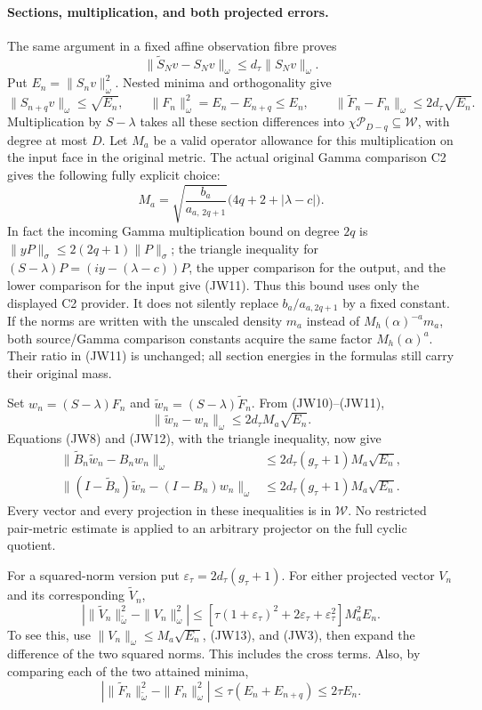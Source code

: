 \documentclass[11pt]{article}
\newcommand{\Pcal}{\mathcal P}
\begin{document}
\paragraph{Sections, multiplication, and both projected errors.}
The same argument in a fixed affine observation fibre proves
\[
\|\widetilde S_Nv-S_Nv\|_\omega
\le d_\tau\|S_Nv\|_\omega.
\tag{JW9}
\]
Put \(E_n=\|S_nv\|_\omega^2\).
Nested minima and orthogonality give
\[
\|S_{n+q}v\|_\omega\le\sqrt{E_n},\qquad
\|F_n\|_\omega^2=E_n-E_{n+q}\le E_n,\qquad
\|\widetilde F_n-F_n\|_\omega\le2d_\tau\sqrt{E_n}.
\tag{JW10}
\]
Multiplication by \(S-\lambda\) takes all these section differences
into \(\chi\Pcal_{D-q}\subseteq\mathcal W\), with degree at most \(D\).
Let \(M_a\) be a valid operator allowance for this multiplication on
the input face in the original metric.  The actual original
Gamma comparison C2 gives the following fully explicit choice:
\[
M_a=
\sqrt{\frac{b_a}{a_{a,\,2q+1}}}
\bigl(4q+2+|\lambda-c|\bigr).
\tag{JW11}
\]
In fact the incoming Gamma multiplication bound on degree \(2q\)
is \(\|yP\|_\sigma\le2(2q+1)\|P\|_\sigma\);
the triangle inequality for
\((S-\lambda)P=(iy-(\lambda-c))P\), the upper comparison for the output,
and the lower comparison for the input give (JW11).
Thus this bound uses only the displayed C2 provider.  It does not
silently replace \(b_a/a_{a,2q+1}\) by a fixed constant.
If the norms are written with the unscaled density \(m_a\) instead of
\(M_h(\alpha)^{-a}m_a\), both source/Gamma comparison constants acquire
the same factor \(M_h(\alpha)^a\).  Their ratio in (JW11) is unchanged;
all section energies in the formulas still carry their original mass.

Set \(w_n=(S-\lambda)F_n\) and
\(\widetilde w_n=(S-\lambda)\widetilde F_n\).  From (JW10)--(JW11),
\[
\|\widetilde w_n-w_n\|_\omega
\le2d_\tau M_a\sqrt{E_n}.
\tag{JW12}
\]
Equations (JW8) and (JW12), with the triangle inequality, now give
\[
\begin{split}
\|\widetilde B_n\widetilde w_n-B_nw_n\|_\omega
&\le2d_\tau(g_\tau+1)M_a\sqrt{E_n},\\
\|(I-\widetilde B_n)\widetilde w_n-(I-B_n)w_n\|_\omega
&\le2d_\tau(g_\tau+1)M_a\sqrt{E_n}.
\end{split}
\tag{JW13}
\]
Every vector and every projection in these inequalities is in
\(\mathcal W\).  No restricted pair-metric estimate is applied to
an arbitrary projector on the full cyclic quotient.

For a squared-norm version put
\(\varepsilon_\tau=2d_\tau(g_\tau+1)\).
For either projected vector \(V_n\) and its corresponding
\(\widetilde V_n\),
\[
\left|\|\widetilde V_n\|_{\widetilde\omega}^2
              -\|V_n\|_\omega^2\right|
\le
\left[\tau(1+\varepsilon_\tau)^2
      +2\varepsilon_\tau+\varepsilon_\tau^2\right]M_a^2E_n.
\tag{JW14}
\]
To see this, use \(\|V_n\|_\omega\le M_a\sqrt{E_n}\),
(JW13), and (JW3), then expand the difference of the two squared
norms.  This includes the cross terms.
Also, by comparing each of the two attained minima,
\[
\left|\|\widetilde F_n\|_{\widetilde\omega}^2
              -\|F_n\|_\omega^2\right|
\le\tau(E_n+E_{n+q})\le2\tau E_n.
\tag{JW15}
\]
\end{document}
